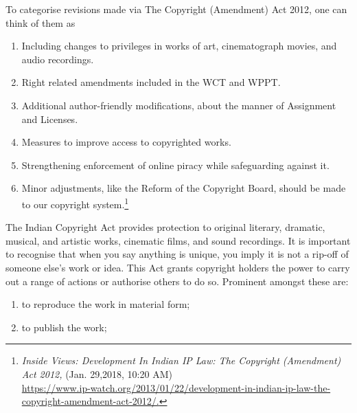 \begin{multicols}{2}
\noi
To categorise revisions made via The Copyright (Amendment) Act 2012, one can think of
them as

\vspace{-.1cm}

\begin{enumerate}[label=$\bullet$]
\itemsep=0pt
\item Including changes to privileges in works of art, cinematograph movies, and audio
recordings.

\item Right related amendments included in the WCT and WPPT.

\item Additional author-friendly modifications, about the manner of Assignment and
Licenses.

\item Measures to improve access to copyrighted works.

\item Strengthening enforcement of online piracy while safeguarding against it.

\item Minor adjustments, like the Reform of the Copyright Board, should be made to our
copyright system.\footnote{\textit{Inside Views: Development In Indian IP Law: The Copyright (Amendment) Act 2012,} (Jan. 29,2018, 10:20 AM)\\  \url{https://www.ip-watch.org/2013/01/22/development-in-indian-ip-law-the-copyright-amendment-act-2012/.}}
\end{enumerate}

\vspace{-.1cm}

\noi
The Indian Copyright Act provides protection to original literary, dramatic, musical, and
artistic works, cinematic films, and sound recordings. It is important to recognise that
when you say anything is unique, you imply it is not a rip-off of someone else's work or
idea. This Act grants copyright holders the power to carry out a range of actions or
authorise others to do so. Prominent amongst these are:

\vspace{-.2cm}

\begin{enumerate}[label=$\bullet$]
\itemsep=0pt

\item to reproduce the work in material form;

\item to publish the work;


\end{enumerate}
\end{multicols}

